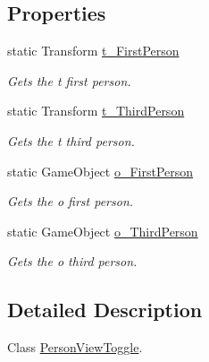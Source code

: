 \subsection*{Properties}
\begin{DoxyCompactItemize}
\item 
static Transform \hyperlink{class_lerp2_a_p_i_1_1_controllers_1_1_person_view_1_1_person_view_toggle_ae60d7bea2530c9ab326128ff4877d70d}{t\+\_\+\+First\+Person}
\begin{DoxyCompactList}\small\item\em Gets the t first person. \end{DoxyCompactList}\item 
static Transform \hyperlink{class_lerp2_a_p_i_1_1_controllers_1_1_person_view_1_1_person_view_toggle_af560892505285241b96fc28c39d48f6c}{t\+\_\+\+Third\+Person}
\begin{DoxyCompactList}\small\item\em Gets the t third person. \end{DoxyCompactList}\item 
static Game\+Object \hyperlink{class_lerp2_a_p_i_1_1_controllers_1_1_person_view_1_1_person_view_toggle_ae65a49d8722ad7438512dccfe85c1a7f}{o\+\_\+\+First\+Person}
\begin{DoxyCompactList}\small\item\em Gets the o first person. \end{DoxyCompactList}\item 
static Game\+Object \hyperlink{class_lerp2_a_p_i_1_1_controllers_1_1_person_view_1_1_person_view_toggle_a24f7b490f578fb5c27dea1edb5b7e789}{o\+\_\+\+Third\+Person}
\begin{DoxyCompactList}\small\item\em Gets the o third person. \end{DoxyCompactList}\end{DoxyCompactItemize}


\subsection{Detailed Description}
Class \hyperlink{class_lerp2_a_p_i_1_1_controllers_1_1_person_view_1_1_person_view_toggle}{Person\+View\+Toggle}. 



